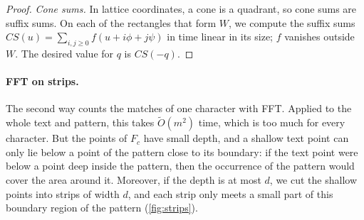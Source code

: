 \documentclass[11pt]{article}
\theoremstyle{definition}
\newcommand{\tO}{\tilde{O}}
\begin{document}
\begin{proof}
\emph{Cone sums.}
In lattice coordinates, a cone is a quadrant, so cone sums are suffix sums.
On each of the rectangles that form $W$, we compute the suffix sums $\mathit{CS}(u) = \sum_{i, j \ge 0} f(u + i\phi + j\psi)$ in time linear in its size; $f$ vanishes outside $W$.
The desired value for $q$ is $\mathit{CS}(-q)$.
\end{proof}

\paragraph{FFT on strips.}
The second way counts the matches of one character with FFT.
Applied to the whole text and pattern, this takes $\tO(m^2)$ time, which is too much for every character.
But the points of $F_c$ have small depth, and a shallow text point can only lie below a point of the pattern close to its boundary: if the text point were below a point deep inside the pattern, then the occurrence of the pattern would cover the area around it.
Moreover, if the depth is at most $d$, we cut the shallow points into strips of width $d$, and each strip only meets a small part of this boundary region of the pattern (\autoref{fig:strips}).
\end{document}
